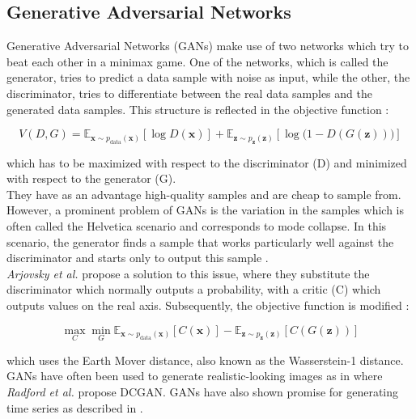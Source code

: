 \subsection{Generative Adversarial Networks}

Generative Adversarial Networks (GANs) make use of two networks which try to beat each other in a minimax game. One of the networks, which is called the generator, tries to predict a data sample with noise as input, while the other, the discriminator, tries to differentiate between the real data samples and the generated data samples. This structure is reflected in the objective function \cite{goodfellow_generative_2014}:

\begin{equation}
V(D, G) = \mathbb{E}_{\mathbf{x} \sim p_{\text{data}}(\mathbf{x})} \left[ \log D(\mathbf{x}) \right] + \mathbb{E}_{\mathbf{z} \sim p_\mathbf{z}(\mathbf{z})} \left[ \log \big( 1 - D(G(\mathbf{z})) \big) \right]
\end{equation}

\noindent which has to be maximized with respect to the discriminator (D) and minimized with respect to the generator (G). 
\\
They have as an advantage high-quality samples and are cheap to sample from. However, a prominent problem of GANs is the variation in the samples which is often called the Helvetica scenario and corresponds to mode collapse. In this scenario, the generator finds a sample that works particularly well against the discriminator and starts only to output this sample \cite{goodfellow_generative_2014}. 
\\
\textit{Arjovsky et al.} \cite{arjovsky_wasserstein_2017} propose a solution to this issue, where they substitute the discriminator which normally outputs a probability, with a critic (C) which outputs values on the real axis. Subsequently, the objective function is modified \cite{arjovsky_wasserstein_2017}:

\begin{equation}
\max_C \min_G \mathbb{E}_{\mathbf{x} \sim p_{\text{data}}(\mathbf{x})} \left[ C(\mathbf{x}) \right] - \mathbb{E}_{\mathbf{z} \sim p_\mathbf{z}(\mathbf{z})} \left[ C(G(\mathbf{z})) \right]
\end{equation}

\noindent which uses the Earth Mover distance, also known as the Wasserstein-1 distance. 
\\
GANs have often been used to generate realistic-looking images as in \cite{radford_unsupervised_2016} where \textit{Radford et al.} propose DCGAN. GANs have also shown promise for generating time series as described in \cite{esteban_real-valued_2017, mogren_c-rnn-gan_2016}.

